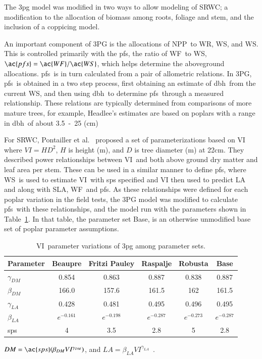 \documentclass[preprint,12pt]{elsarticle}
\begin{document}
The \ac{3pg} model was modified in two ways to allow modeling of
\ac{SRWC}; a modification to the allocation of biomass among roots,
foliage and stem, and the inclusion of a coppicing model.

An important component of 3PG is the allocations of \ac{NPP}~to \ac{WR}, \ac{WS}, and
\ac{WS}.  This is controlled primarily with the \ac{pfs}, the ratio of \ac{WF}~to \ac{WS},
$\ac{pfs}=\ac{WF}/\ac{WS}$, which helps determine the aboveground allocations.  \ac{pfs}~is in
turn calculated from a pair of allometric relations.  In 3PG, \ac{pfs}~is obtained
in a two step process, first obtaining an estimate of \ac{dbh}~from the current \ac{WS},
and then using \ac{dbh}~to determine \ac{pfs}~through a measured relationship.  These
relations are typically determined from comparisons of more mature trees, for
example, Headlee's estimates are based on poplars with a range in \ac{dbh}~of about
3.5~-~25 (cm)~\cite{Headlee2012}%

For \ac{SRWC}, Pontailler et al.~\cite{pontailler97-volume-index}
proposed a set of parameterizations based on \ac{VI} where $VI =
HD^2$, $H$ is height (m), and $D$ is tree diameter (m) at 22cm.  They
described power relationships between \ac{VI}~and both above ground
dry matter and leaf area per stem. These can be used in a similar
manner to define \ac{pfs}, where \ac{WS}~is used to estimate
\ac{VI}~with \ac{sps} specified and \ac{VI} then used to predict
\ac{LA} and along with \ac{SLA}, \ac{WF}~and \ac{pfs}. As these
relationships were defined for each poplar variation in the field
tests, the 3PG model was modified to calculate \ac{pfs}~with these
relationships, and the model run with the parameters shown in
Table~\ref{tab:pont-3pg}.  In that table, the parameter set Base, is
an otherwise unmodified base set of poplar parameter assumptions.

\begin{table}%
  \caption{\ac{VI}~parameter variations of \ac{3pg} among parameter sets.}
  \begin{tabular}{|lccccc|}
    \hline
    Parameter & Beaupre & Fritzi Pauley & Raspalje & Robusta & Base\\
    \hline
    $\gamma_{DM}$ &  0.854 & 0.863 & 0.887 & 0.838 & 0.887\\
    $\beta_{DM}$  & 166.0 & 157.6 & 161.5 & 162 & 161.5\\
    $\gamma_{LA}$ &  0.428 &  0.481 & 0.495 & 0.496 & 0.495\\ 
    $\beta_{LA}$ & $e^{-0.161}$ & $e^{-0.198}$ & $e^{-0.287}$ & $e^{-0.273}$ & $e^{-0.287}$\\
    \ac{sps} & 4 & 3.5 & 2.8 & 5 & 2.8\\
    \hline 
  \end{tabular}
  \begin{flushleft}$DM=\ac{sps}(\beta_{DM} VI^{\gamma_{DM}})$, and $LA = \beta_{LA} VI^{\gamma_{LA}}$~\cite{pontailler97-volume-index}.
\end{flushleft}  
\label{tab:pont-3pg}
\end{table}
\end{document}
